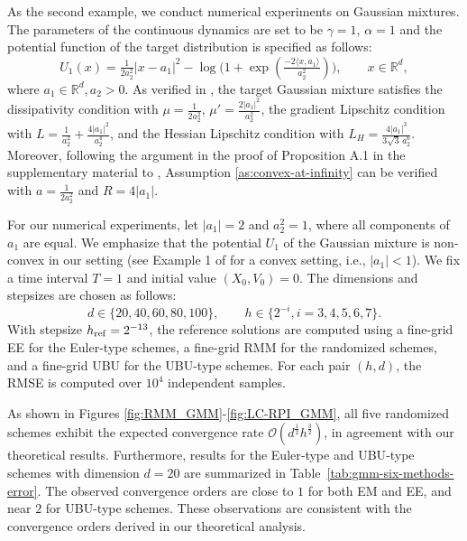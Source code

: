 \documentclass[12pt]{article}
\newenvironment{redtext}
  {\color{black}\ignorespaces}
  {\ignorespacesafterend}
\numberwithin{equation}{section}
\begin{document}
As the second example, we conduct numerical experiments on Gaussian mixtures. The parameters of the continuous dynamics are set to be $\gamma=1$, $\alpha=1$ and the potential function of the target distribution is specified as follows:
\begin{equation}
    U_1(x)
    =
    \tfrac{1}{2a_2^2} |x-a_1|^2
    -
    \log\bigl(1+\exp(\tfrac{-2\langle x,a_1\rangle}{a_2^2})\bigr),
    \qquad
    x\in \mathbb R^d ,
\end{equation}
where \(a_1\in\mathbb R^d, a_2>0 \).
As verified in \cite[Proposition 3.1]{neufeld2025non}, the target Gaussian mixture satisfies the dissipativity condition with $\mu= \frac{1}{2a_2^2}$, $\mu' = \frac{2|a_1|^2}{a_2^2}$, the gradient Lipschitz condition with $L = \frac{1}{a_2^2} + \frac{4|a_1|^2}{a_2^4}$, and the Hessian Lipschitz condition with $
L_H=\frac{4|a_1|^3}{3\sqrt3\,a_2^6}$. 
Moreover, following the argument in the proof
of Proposition A.1 in the supplementary material to
\cite{mou2022improved}, Assumption \ref{as:convex-at-infinity}
can be verified with $a=\frac{1}{2a_2^2}$ and $R=4|a_1|$.

For our numerical experiments, let $|a_1|=2$ and $a^2_2=1$, where all components of $a_1$ are equal. 
We emphasize that the potential $U_1$ of the Gaussian mixture is non-convex in our setting (see Example 1 of \cite{dalalyan2017theoretical} for a convex setting, i.e., $|a_1| < 1$).
We fix a time interval $T=1$ and initial value $(X_0,V_0)=0$. 
The dimensions and stepsizes are chosen as follows:
\[
    d\in\{20,40,60,80,100\},
    \qquad
    h \in \{2^{-i}, i=3,4,5,6,7\}.
\]
With stepsize $h_{\rm ref} = 2^{-13}$, the reference solutions are computed using a fine-grid EE for the Euler-type schemes, a fine-grid RMM for the randomized schemes, and a fine-grid UBU for the UBU-type schemes.  For each pair \((h,d)\), the RMSE is computed over \(10^4\) independent samples. 

As shown in Figures \ref{fig:RMM_GMM}-\ref{fig:LC-RPI_GMM}, all five randomized schemes exhibit the expected convergence rate \(\mathcal{O}(d^{\frac12}h^{\frac32})\), in agreement with our theoretical results.
Furthermore, results for the Euler‑type and UBU‑type schemes with dimension $d=20$ are summarized in Table~\ref{tab:gmm-six-methods-error}. The observed convergence orders are close to $1$ for both EM and EE, and near $2$ for UBU-type schemes. These observations are consistent with the convergence orders derived in our theoretical analysis.
\end{document}
